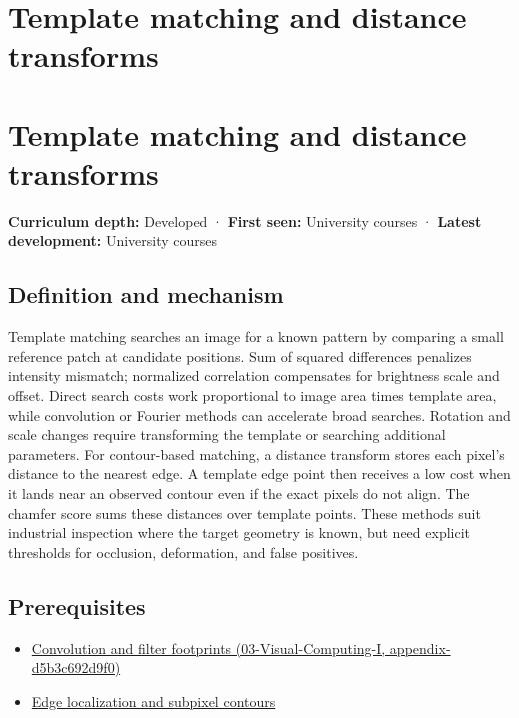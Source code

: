 \hypertarget{appendix-5fb4af80d1c7}{}
\section*{Template matching and distance transforms}
\section{Template matching and distance transforms}\label{appendix-5fb4af80d1c7-template-matching-and-distance-transforms}

\textbf{Curriculum depth:} Developed · \textbf{First seen:} University courses · \textbf{Latest development:} University courses

\subsection{Definition and mechanism}\label{appendix-5fb4af80d1c7-definition-and-mechanism}

Template matching searches an image for a known pattern by comparing a small reference patch at candidate positions. Sum of squared differences penalizes intensity mismatch; normalized correlation compensates for brightness scale and offset. Direct search costs work proportional to image area times template area, while convolution or Fourier methods can accelerate broad searches. Rotation and scale changes require transforming the template or searching additional parameters. For contour-based matching, a distance transform stores each pixel's distance to the nearest edge. A template edge point then receives a low cost when it lands near an observed contour even if the exact pixels do not align. The chamfer score sums these distances over template points. These methods suit industrial inspection where the target geometry is known, but need explicit thresholds for occlusion, deformation, and false positives.

\subsection{Prerequisites}\label{appendix-5fb4af80d1c7-prerequisites}

\begin{itemize}
\tightlist
\item
  \href{../03-Visual-Computing-I/main.pdf\#nameddest=appendix-d5b3c692d9f0}{Convolution and filter footprints (03-Visual-Computing-I, appendix-d5b3c692d9f0)}
\item
  \hyperref[appendix-36022286b03e]{Edge localization and subpixel contours}
\end{itemize}

